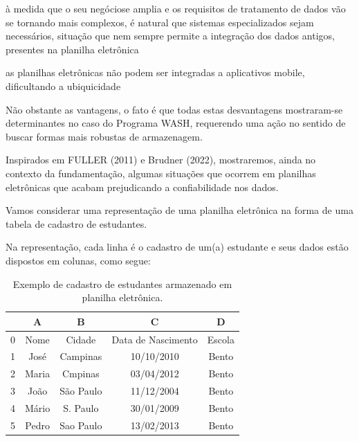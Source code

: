\documentclass[
12pt,		%
openright,	%
twoside,  %
a4paper,			%
chapter=TITLE,		%
english,			%
french,				%
spanish,			%
brazil				%
]{USPSC-classe/USPSC}
\begin{document}
\begin{alineas}
\item \`a medida que o seu \textquotedbl neg\'ocio\textquotedbl  se amplia e os requisitos de tratamento de dados v\~ao se tornando mais complexos, \'e natural que sistemas especializados sejam necess\'arios, situa\c{c}\~ao que nem sempre permite a integra\c{c}\~ao dos dados antigos, presentes na planilha eletr\^onica
\item as planilhas eletr\^onicas n\~ao podem ser integradas a aplicativos mobile, dificultando a ubiquicidade
\end{alineas}

N\~ao obstante as vantagens, o fato \'e que todas estas desvantagens mostraram-se determinantes no caso do Programa WASH, requerendo uma a\c{c}\~ao no sentido de buscar formas mais robustas de armazenagem.










Inspirados em  FULLER (2011) e  Brudner (2022), mostraremos, ainda no contexto da fundamenta\c{c}\~ao, algumas situa\c{c}\~oes que ocorrem em planilhas eletr\^onicas que acabam prejudicando a confiabilidade nos dados.










Vamos considerar uma representa\c{c}\~ao de uma planilha eletr\^onica na forma de uma tabela de cadastro de estudantes.










Na representa\c{c}\~ao, cada linha \'e o cadastro de um(a) estudante e seus dados est\~ao dispostos em colunas, como segue:














\begin{table}[htb]
\tiny
\caption{\label{ddd7a335bbc10f88eaaf4abda266d151f0ba0e6f}Exemplo de cadastro de estudantes armazenado em planilha eletr\^onica.}

\centering
\begin{tabular}{|c|c|c|c|c|}
\hline
  &  A  &  B  &  C  &  D  \\
\hline
0 & Nome  &  Cidade  &  Data de Nascimento  &  Escola \\
1 & Jos\'e  &  Campinas  &  10/10/2010  &  Bento \\
2 & Maria  &  Cmpinas  &  03/04/2012  &  Bento \\
3 & Jo\~ao  &  S\~ao Paulo  &  11/12/2004  &  Bento \\
4 & M\'ario  &  S. Paulo  &  30/01/2009  &  Bento \\
5 & Pedro  &  Sao Paulo  &  13/02/2013  &  Bento \\
\hline
\end{tabular}
\end{table}
\end{document}
